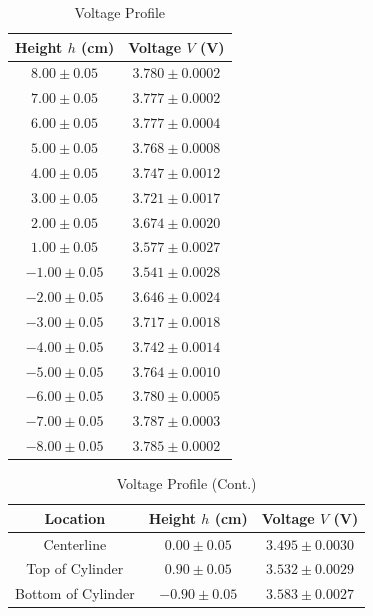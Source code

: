 \documentclass[journal,letterpaper]{IEEEtran}
\renewcommand{\arraystretch}{1.3}
\begin{document}
\begin{table}[H]
    \centering
    \caption{Voltage Profile}
    \renewcommand{\arraystretch}{1.11}
    \begin{tabular}{cc}
    \toprule
    Height $h$ (cm) & Voltage $V$ (V) \\ \midrule \midrule
    $8.00 \pm 0.05 $ & $3.780 \pm 0.0002$ \\
    $7.00 \pm 0.05 $ & $3.777 \pm 0.0002$ \\
    $6.00 \pm 0.05 $ & $3.777 \pm 0.0004$ \\
    $5.00 \pm 0.05 $ & $3.768 \pm 0.0008$ \\
    $4.00 \pm 0.05 $ & $3.747 \pm 0.0012$ \\
    $3.00 \pm 0.05 $ & $3.721 \pm 0.0017$ \\
    $2.00 \pm 0.05 $ & $3.674 \pm 0.0020$ \\
    $1.00 \pm 0.05 $ & $3.577 \pm 0.0027$ \\
    $-1.00 \pm 0.05$ & $3.541 \pm 0.0028$ \\
    $-2.00 \pm 0.05$ & $3.646 \pm 0.0024$ \\
    $-3.00 \pm 0.05$ & $3.717 \pm 0.0018$ \\
    $-4.00 \pm 0.05$ & $3.742 \pm 0.0014$ \\
    $-5.00 \pm 0.05$ & $3.764 \pm 0.0010$ \\
    $-6.00 \pm 0.05$ & $3.780 \pm 0.0005$ \\
    $-7.00 \pm 0.05$ & $3.787 \pm 0.0003$ \\
    $-8.00 \pm 0.05$ & $3.785 \pm 0.0002$ \\ \bottomrule
    \end{tabular}
    \label{tab:voltage}
\end{table}

\begin{table}[H]
    \centering
    \caption{Voltage Profile (Cont.)}
    \begin{tabular}{ccc}
    \toprule
    Location & Height $h$ (cm) & Voltage $V$ (V) \\ \midrule \midrule
    Centerline & $0.00 \pm 0.05$ & $3.495 \pm 0.0030$ \\
    Top of Cylinder & $0.90 \pm 0.05$ & $3.532 \pm 0.0029$ \\
    Bottom of Cylinder & $-0.90 \pm 0.05$ & $3.583 \pm 0.0027$ \\ \bottomrule
    \end{tabular}
    \label{tab:voltages}
\end{table}
\end{document}
